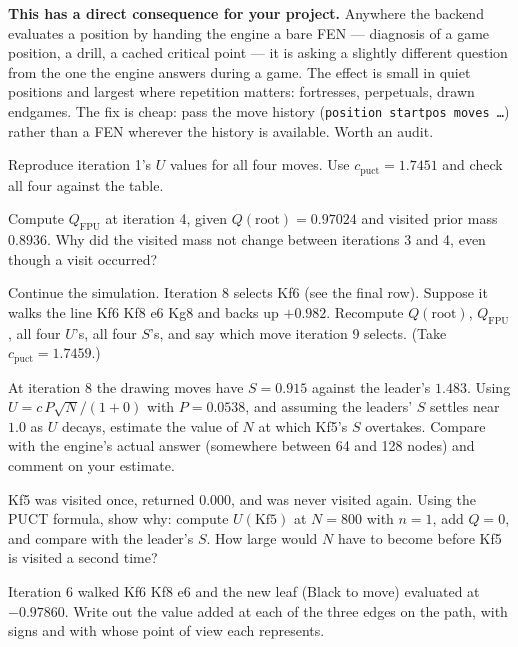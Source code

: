 \begin{pitfall}
\textbf{This has a direct consequence for your project.} Anywhere the backend evaluates a
position by handing the engine a bare FEN --- diagnosis of a game position, a drill, a cached
critical point --- it is asking a slightly different question from the one the engine answers
during a game. The effect is small in quiet positions and largest where repetition matters:
fortresses, perpetuals, drawn endgames. The fix is cheap: pass the move history
(\texttt{position startpos moves \ldots}) rather than a FEN wherever the history is available.
Worth an audit.
\end{pitfall}

\begin{exercises}

 Reproduce iteration 1's $U$ values for all four moves. Use
$c_{\text{puct}} = 1.7451$ and check all four against the table.

 Compute $Q_{\text{FPU}}$ at iteration 4, given
$Q(\text{root}) = 0.97024$ and visited prior mass $0.8936$. Why did the visited mass not
change between iterations 3 and 4, even though a visit occurred?

 Continue the simulation. Iteration 8 selects Kf6 (see the
final row). Suppose it walks the line Kf6 Kf8 e6 Kg8 and backs up $+0.982$. Recompute
$Q(\text{root})$, $Q_{\text{FPU}}$, all four $U$'s, all four $S$'s, and say which move
iteration 9 selects. (Take $c_{\text{puct}} = 1.7459$.)

 At iteration 8 the drawing moves
have $S = 0.915$ against the leader's $1.483$. Using $U = c\,P\sqrt{N}/(1+0)$ with
$P = 0.0538$, and assuming the leaders' $S$ settles near $1.0$ as $U$ decays, estimate the
value of $N$ at which Kf5's $S$ overtakes. Compare with the engine's actual answer (somewhere
between 64 and 128 nodes) and comment on your estimate.

 Kf5 was visited once, returned $0.000$, and was
never visited again. Using the PUCT formula, show why: compute $U(\text{Kf5})$ at $N = 800$
with $n = 1$, add $Q = 0$, and compare with the leader's $S$. How large would $N$ have to
become before Kf5 is visited a second time?

 Iteration 6 walked Kf6 Kf8 e6 and the new leaf (Black to
move) evaluated at $-0.97860$. Write out the value added at each of the three edges on the
path, with signs and with whose point of view each represents.


\end{exercises}
